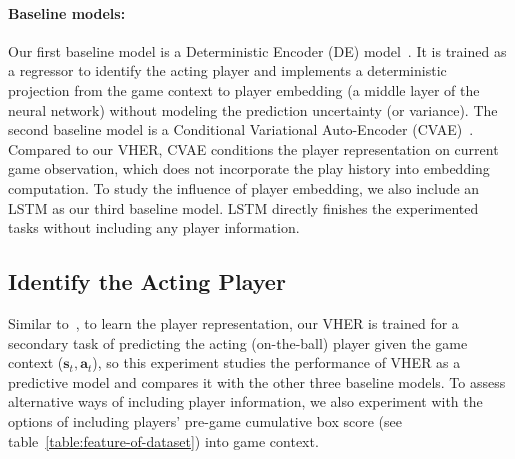 \documentclass[letterpaper]{article} %
\newcommand{\state}{\mathbf{s}}
\newcommand{\action}{\mathbf{a}}
\begin{document}
\paragraph{Baseline models:}
Our first baseline model is a Deterministic Encoder (DE) model~\cite{ganguly2018problem}. It is trained as a regressor to identify the acting player and implements a deterministic projection from the game context to player embedding (a middle layer of the neural network) without modeling the prediction uncertainty (or variance). The second baseline model is a Conditional Variational Auto-Encoder (CVAE)~\cite{wal}. Compared to our VHER, CVAE conditions the player representation on current game observation, which does not incorporate the play history into embedding computation. 
To study the influence of player embedding, we also include an LSTM as our third baseline model. LSTM directly finishes the experimented tasks without including any player information.




\subsection{Identify the Acting Player}
Similar to~\cite{ganguly2018problem}, to learn the player representation, our VHER is trained for a secondary task of predicting the acting (on-the-ball) player given the game context ($\state_{t},\action_{t}$), so this experiment studies the performance of VHER as a predictive model and compares it with the other three baseline models.
To assess alternative ways of including player information, we also experiment with the options of including players' pre-game cumulative box score (see table~\ref{table:feature-of-dataset}) into game context.

\end{document}
